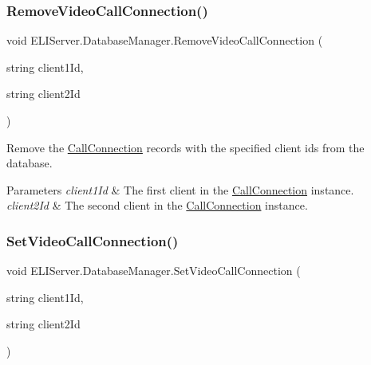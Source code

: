 \subsubsection{\texorpdfstring{Remove\+Video\+Call\+Connection()}{RemoveVideoCallConnection()}}
{\footnotesize\ttfamily void E\+L\+I\+Server.\+Database\+Manager.\+Remove\+Video\+Call\+Connection (\begin{DoxyParamCaption}\item[{string}]{client1\+Id,  }\item[{string}]{client2\+Id }\end{DoxyParamCaption})\hspace{0.3cm}{\ttfamily [inline]}}



Remove the \hyperlink{class_e_l_i_server_1_1_call_connection}{Call\+Connection} records with the specified client ids from the database. 


\begin{DoxyParams}{Parameters}
{\em client1\+Id} & The first client in the \hyperlink{class_e_l_i_server_1_1_call_connection}{Call\+Connection} instance.\\
\hline
{\em client2\+Id} & The second client in the \hyperlink{class_e_l_i_server_1_1_call_connection}{Call\+Connection} instance.\\
\hline
\end{DoxyParams}
\mbox{\label{class_e_l_i_server_1_1_database_manager_a27bf3444db3446216c2a0c7b957895d9}} 
\subsubsection{\texorpdfstring{Set\+Video\+Call\+Connection()}{SetVideoCallConnection()}}
{\footnotesize\ttfamily void E\+L\+I\+Server.\+Database\+Manager.\+Set\+Video\+Call\+Connection (\begin{DoxyParamCaption}\item[{string}]{client1\+Id,  }\item[{string}]{client2\+Id }\end{DoxyParamCaption})\hspace{0.3cm}{\ttfamily [inline]}}




